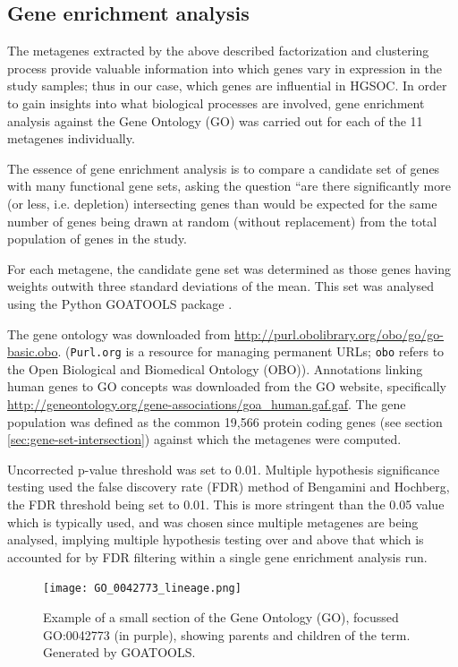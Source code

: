 \documentclass[draft, tikz, 12pt,a4paper,oneside,fleqn]{article}
\begin{document}
\subsection{Gene enrichment analysis}

The metagenes extracted by the above described factorization and clustering process provide valuable information into which genes vary in expression in the study samples; thus in our case, which genes are influential in HGSOC.  
In order to gain insights into what biological processes are involved, gene enrichment analysis against the Gene Ontology (GO) was carried out for each of the 11 metagenes individually.

The essence of gene enrichment analysis is to compare a candidate set of genes with many functional gene sets, asking the question ``are there significantly more (or less, i.e. depletion) intersecting genes than would be expected for the same number of genes being drawn at random (without replacement) from the total population of genes in the study. 

For each metagene, the candidate gene set was determined as those genes having weights outwith three standard deviations of the mean.   This set was analysed using the Python GOATOOLS package \cite{Klopfenstein2018}.   

The gene ontology was downloaded from \url{http://purl.obolibrary.org/obo/go/go-basic.obo}.  ({\tt Purl.org} is a resource for managing permanent URLs; {\tt obo} refers to the Open Biological and Biomedical Ontology (OBO)).  
Annotations linking human genes to GO concepts was downloaded from the GO website, specifically \url{http://geneontology.org/gene-associations/goa_human.gaf.gaf}.   
The gene population was defined as the common 19,566 protein coding genes (see section \ref{sec:gene-set-intersection}) against which the metagenes were computed.  

Uncorrected p-value threshold was set to 0.01.
Multiple hypothesis significance testing used the false discovery rate (FDR) method of Bengamini and Hochberg, the FDR threshold being set to 0.01.  This is more stringent than the 0.05 value which is typically used, and was chosen since multiple metagenes are being analysed, implying multiple hypothesis testing over and above that which is accounted for by FDR filtering within a single gene enrichment analysis run.

\begin{figure}[ht]
\begin{center}
\texttt{[image: GO\_0042773\_lineage.png]}
\caption{Example of a small section of the Gene Ontology (GO), focussed GO:0042773 (in purple), showing parents and children of the term.   Generated by GOATOOLS.}
\label{fig:eg_go_graphic}
\end{center}
\end{figure}
\end{document}
